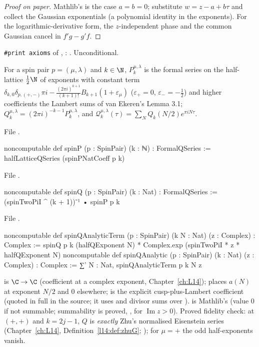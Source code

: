 \begin{proof}[Proof on paper]
Mathlib's  is the case $a=b=0$; substitute
$w=z-a+b\tau$ and collect the Gaussian exponentials (a polynomial identity in the exponents). For the
logarithmic-derivative form, the $z$-independent phase and the common Gaussian cancel in
$f'g-g'f$.
\end{proof}
\begin{status}
\texttt{\#print axioms} of , : . Unconditional.
\end{status}

\begin{definition}\label{l17:def:spinP}
For a spin pair $p=(\mu,\lambda)$ and $k\in\N$, $P^{\mu,\lambda}_k$ is the formal series on the half-lattice
$\frac12\N$ of exponents with constant term $\delta_{k,0}\delta_{p,(+,-)}\pi i-\frac{(2\pi i)^{k+1}}{(k+1)!}B_{k+1}(1+\varepsilon_\mu)$
($\varepsilon_+=0$, $\varepsilon_-=-\frac12$) and higher coefficients the Lambert sums of van Ekeren's
Lemma 3.1; $Q^{\mu,\lambda}_k=(2\pi i)^{-k-1}P^{\mu,\lambda}_k$, and $\mathcal Q^{\mu,\lambda}_k(\tau)=\sum_NQ_k(N/2)e^{\pi iN\tau}$.
\end{definition}
\noindent File .
\begin{leancode}
noncomputable def spinP (p : SpinPair) (k : ℕ) : FormalQSeries :=
  halfLatticeQSeries (spinPNatCoeff p k)
\end{leancode}
\noindent File .
\begin{leancode}
noncomputable def spinQ (p : SpinPair) (k : Nat) : FormalQSeries :=
  (spinTwoPiI ^ (k + 1))⁻¹ • spinP p k
\end{leancode}
\noindent File .
\begin{leancode}
noncomputable def spinQAnalyticTerm (p : SpinPair) (k N : Nat) (z : Complex) : Complex :=
  spinQ p k (halfQExponent N) *
    Complex.exp (spinTwoPiI * z * halfQExponent N)
noncomputable def spinQAnalytic (p : SpinPair) (k : Nat) (z : Complex) : Complex :=
  ∑' N : Nat, spinQAnalyticTerm p k N z
\end{leancode}
\begin{dictionary}
 is $\C\to\C$ (coefficient at a complex exponent, Chapter~\ref{ch:L14});
 places $a(N)$ at exponent $N/2$ and $0$ elsewhere; 
is the explicit cusp-plus-Lambert coefficient (quoted in full in the source; it uses
 and divisor sums over ).  is
Mathlib's  (value $0$ if not summable; summability is proved,
, for $\operatorname{Im}z>0$). Proved fidelity check: at $(+,+)$ and
$k=2j-1$, $Q$ is \emph{exactly} Zhu's normalised Eisenstein series 
(Chapter~\ref{ch:L14}, Definition~\ref{l14:def:zhuG}; ); for
$\mu=+$ the odd half-exponents vanish.
\end{dictionary}
